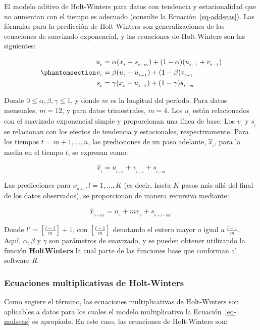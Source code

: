 \documentclass[
  us-letterpaper,
]{scrreprt}
\theoremstyle{definition}
\theoremstyle{plain}
\theoremstyle{plain}
\theoremstyle{definition}
\theoremstyle{remark}
\begin{document}
El modelo aditivo de Holt-Winters para datos con tendencia y
estacionalidad que no aumentan con el tiempo es adecuado (consulte la
Ecuación~\ref{eq-addseas}). Las fórmulas para la predicción de
Holt-Winters son generalizaciones de las ecuaciones de suavizado
exponencial, y las ecuaciones de Holt-Winters son las siguientes:

\begin{equation}\phantomsection\label{eq-extexp}{
\begin{split}
u_{_t}&= \alpha(x_{_t}-s_{_{t-m}})+(1-\alpha)(u_{_{t-1}}+v_{_{t-1}})\\
v_{_t}&= \beta(u_{_t}-u_{_{t-1}})+(1-\beta)v_{_{t-1}}\\
s_{_t}&= \gamma(x_{_t}-u_{_{t-1}})+(1-\gamma)s_{_{t-m}}
\end{split}
}\end{equation}

Donde \(0 \le \alpha, \beta, \gamma \le 1\), y donde \(m\) es la
longitud del período. Para datos mensuales, \(m = 12\), y para datos
trimestrales, \(m = 4\). Los \(u_{_t}\) están relacionados con el
suavizado exponencial simple y proporcionan una línea de base. Los
\(v_{_t}\) y \(s_{_t}\) se relacionan con los efectos de tendencia y
estacionales, respectivamente. Para los tiempos \(t= m+1,\ldots, n\),
las predicciones de un paso adelante, \(\hat{x}_{_t}\), para la media en
el tiempo \(t\), se expresan como:

\[ \hat{x}_{_t}= u_{_{t-1}}+v_{_{t-1}}+s_{_{t-m}} \]

Las predicciones para \(x_{_{n+l}}, l=1,\ldots,K\) (es decir, hasta
\(K\) pasos más allá del final de los datos observados), se proporcionan
de manera recursiva mediante:

\[
\hat{x}_{_{n+l|n}}=u_{_n}+mv_{_n}+s_{_{n+l-ml'.}}
\]

Donde \(l' =\left[ \frac{l-1}{m} \right] + 1\), con
\(\left[ \frac{l-1}{m} \right]\) denotando el entero mayor o igual a
\(\frac{l-1}{m}\). Aquí, \(\alpha, \beta\) y \(\gamma\) son parámetros
de suavizado, y se pueden obtener utilizando la función
\textbf{HoltWinters} la cual parte de las funciones base que conforman
al software \emph{R}.

\subsubsection{Ecuaciones multiplicativas de
Holt-Winters}\label{ecuaciones-multiplicativas-de-holt-winters}

Como sugiere el término, las ecuaciones multiplicativas de Holt-Winters
son aplicables a datos para los cuales el modelo multiplicativo la
Ecuación~\ref{eq-mulseas} es apropiado. En este caso, las ecuaciones de
Holt-Winters son:
\end{document}
